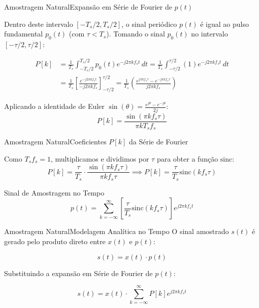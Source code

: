 \begin{frame}{Amostragem Natural}{Expansão em Série de Fourier de $p(t)$}
	
	Dentro deste intervalo $[-T_s/2, T_s/2]$, o sinal periódico $p(t)$ é igual ao pulso fundamental $p_0(t)$ (com $\tau < T_s$). Tomando o sinal $p_0(t)$ no intervalo $[-\tau/2, \tau/2]$:
	
	\begin{align*}
		P[k] &= \frac{1}{T_s} \int_{-T_s/2}^{T_s/2} p_0(t) e^{-j 2\pi k f_s t} \, dt = \frac{1}{T_s} \int_{-\tau/2}^{\tau/2} (1) e^{-j 2\pi k f_s t} \, dt \\[6pt]
		&= \frac{1}{T_s} \left[ \frac{e^{-j 2\pi k f_s t}}{-j 2\pi k f_s} \right]_{-\tau/2}^{\tau/2} = \frac{1}{T_s} \left( \frac{e^{j \pi k f_s \tau} - e^{-j \pi k f_s \tau}}{j 2\pi k f_s} \right)
	\end{align*}
	
	Aplicando a identidade de Euler $\sin(\theta) = \frac{e^{j\theta} - e^{-j\theta}}{2j}$:
	\begin{equation*}
		P[k] = \frac{\sin(\pi k f_s \tau)}{\pi k T_s f_s}
	\end{equation*}
	
\end{frame}

\begin{frame}{Amostragem Natural}{Coeficientes $P[k]$ da Série de Fourier}
		
	Como $T_s f_s = 1$, multiplicamos e dividimos por $\tau$ para obter a função $\text{sinc}$:
	\begin{equation}
		P[k] = \frac{\tau}{T_s} \cdot \frac{\sin(\pi k f_s \tau)}{\pi k f_s \tau} \implies P[k] = \frac{\tau}{T_s} \text{sinc}(k f_s \tau)
		\label{eq: definicao_pk_natural}
	\end{equation}
	
	\begin{block}{Sinal de Amostragem no Tempo}
		\begin{equation}
			p(t) = \sum_{k=-\infty}^{\infty} \left[ \frac{\tau}{T_s} \text{sinc}(k f_s \tau) \right] e^{j 2\pi k f_s t}
			\label{eq: sinal_amostragem_tempo_natural}
		\end{equation}
	\end{block}
\end{frame}

\begin{frame}{Amostragem Natural}{Modelagem Analítica no Tempo}
	O sinal amostrado $s(t)$ é gerado pelo produto direto entre $x(t)$ e $p(t)$:
	
	\begin{equation}
		s(t) = x(t) \cdot p(t)
		\label{eq: definicao_amostragem_natural}
	\end{equation}
	
	Substituindo a expansão em Série de Fourier de $p(t)$:
	
	\begin{equation*}
		s(t) = x(t) \cdot \sum_{k=-\infty}^{\infty} P[k] e^{j 2\pi k f_s t}
	\end{equation*}
	
	
\end{frame}

